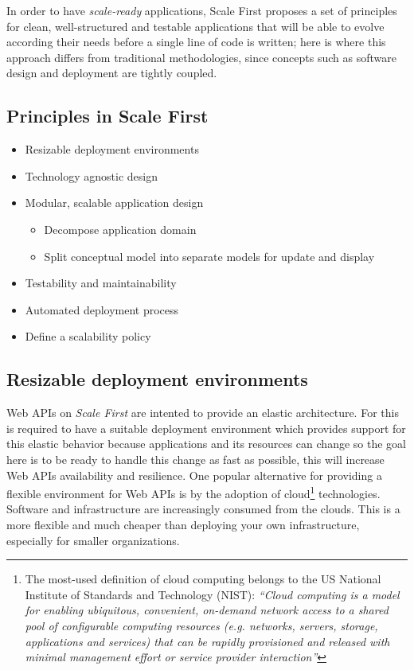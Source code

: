 \documentclass[10pt,article]{IEEEtran}
\begin{document}
In order to have \textit{scale-ready} applications, Scale First proposes a set of principles for clean, well-structured and testable applications that will be able to evolve according their needs before a single line of code is written; here is where this approach differs from traditional methodologies, since concepts such as software design and deployment are tightly coupled. 

 
\subsection{Principles in Scale First}
\begin{itemize}
    \item Resizable deployment environments
    \item Technology agnostic design
    \item Modular, scalable application design
    \begin{itemize}
        \item Decompose application domain 
        \item Split conceptual model into separate models for update and display
    \end{itemize}
    \item Testability and maintainability
    \item Automated deployment process
    \item Define a scalability policy
\end{itemize}

\subsection{Resizable deployment environments}
Web APIs on \textit{Scale First} are intented to provide an elastic architecture. For this is required to have a suitable deployment environment which provides support for this elastic behavior because applications and its resources can change so the goal here is to be ready to handle this change as fast as possible, this will increase Web APIs availability and resilience. One popular alternative for providing a flexible environment for Web APIs is by the adoption of cloud\footnote{The most-used definition of cloud computing belongs to the US National Institute of Standards and Technology (NIST): \textit{``Cloud computing is a model for enabling ubiquitous, convenient, on-demand network access to a shared pool of configurable computing resources (e.g. networks, servers, storage, applications and services) that can be rapidly provisioned and released with minimal management effort or service provider interaction\cite{nist:cloud-definition}''}} technologies. Software and infrastructure are increasingly consumed from the clouds. This is a more flexible and much cheaper than deploying your own infrastructure, especially for smaller organizations.
\end{document}

